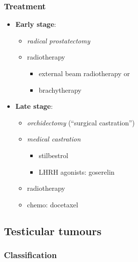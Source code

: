 \documentclass[
  14pt,
]{extarticle}
\providecommand{\tightlist}{%
  \setlength{\itemsep}{0pt}\setlength{\parskip}{0pt}}
\begin{document}
\hypertarget{treatment-7}{%
\subsubsection{Treatment}\label{treatment-7}}

\begin{itemize}
\tightlist
\item
  \textbf{Early stage}:

  \begin{itemize}
  \tightlist
  \item
    \emph{radical prostatectomy}
  \item
    radiotherapy

    \begin{itemize}
    \tightlist
    \item
      external beam radiotherapy or
    \item
      brachytherapy
    \end{itemize}
  \end{itemize}
\item
  \textbf{Late stage}:

  \begin{itemize}
  \tightlist
  \item
    \emph{orchidectomy} (``surgical castration'')
  \item
    \emph{medical castration}

    \begin{itemize}
    \tightlist
    \item
      stilbestrol
    \item
      LHRH agonists: goserelin
    \end{itemize}
  \item
    radiotherapy
  \item
    chemo: docetaxel
  \end{itemize}
\end{itemize}

\pagebreak

\hypertarget{testicular-tumours}{%
\subsection{Testicular tumours}\label{testicular-tumours}}

\hypertarget{classification}{%
\subsubsection{Classification}\label{classification}}
\end{document}

